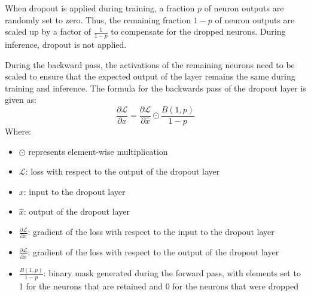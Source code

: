 \documentclass[a4paper]{article}
\newcommand{\ELL}{\mathcal{L}}
\begin{document}
When dropout is applied during training, a fraction $p$ of neuron outputs are randomly set to zero. Thus, the remaining fraction $1-p$ of neuron outputs are scaled up by a factor of $\frac{1}{1-p}$ to compensate for the dropped neurons. During inference, dropout is not applied.

During the backward pass, the activations of the remaining neurons need to be scaled to ensure that the expected output of the layer remains the same during training and inference. The formula for the backwards pass of the dropout layer is given as:
\begin{equation*}
    \frac{\partial\ELL}{\partial x} = \frac{\partial\ELL}{\partial\hat{x}} \odot \frac{B(1,p)}{1-p}
\end{equation*}
Where:
\begin{itemize}
    \item $\odot$ represents element-wise multiplication
    \item $\ELL$: loss with respect to the output of the dropout layer
    \item $x$: input to the dropout layer
    \item $\hat{x}$: output of the dropout layer
    \item $\frac{\partial\ELL}{\partial x}$: gradient of the loss with respect to the input to the dropout layer
    \item $\frac{\partial\ELL}{\partial\hat{x}}$: gradient of the loss with respect to the output of the dropout layer
    \item $\frac{B(1,p)}{1-p}$: binary mask generated during the forward pass, with elements set to 1 for the neurons that are retained and 0 for the neurons that were dropped
\end{itemize}
\end{document}
